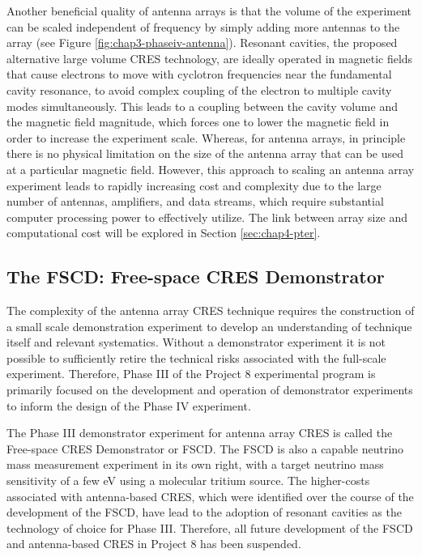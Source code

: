 Another beneficial quality of antenna arrays is that the volume of the experiment can be scaled independent of frequency by simply adding more antennas to the array (see Figure \ref{fig:chap3-phaseiv-antenna}). Resonant cavities, the proposed alternative large volume CRES technology, are ideally operated in magnetic fields that cause electrons to move with cyclotron frequencies near the fundamental cavity resonance, to avoid complex coupling of the electron to multiple cavity modes simultaneously. This leads to a coupling between the cavity volume and the magnetic field magnitude, which forces one to lower the magnetic field in order to increase the experiment scale. Whereas, for antenna arrays, in principle there is no physical limitation on the size of the antenna array that can be used at a particular magnetic field. However, this approach to scaling an antenna array experiment leads to rapidly increasing cost and complexity due to the large number of antennas, amplifiers, and data streams, which require substantial computer processing power to effectively utilize. The link between array size and computational cost will be explored in Section \ref{sec:chap4-pter}.

\subsection{The FSCD: Free-space CRES Demonstrator}
\label{sec:chap3-fscd}

The complexity of the antenna array CRES technique requires the construction of a small scale demonstration experiment to develop an understanding of technique itself and relevant systematics. Without a demonstrator experiment it is not possible to sufficiently retire the technical risks associated with the full-scale experiment. Therefore, Phase III of the Project 8 experimental program is primarily focused on the development and operation of demonstrator experiments to inform the design of the Phase IV experiment.

The Phase III demonstrator experiment for antenna array CRES is called the Free-space CRES Demonstrator or FSCD. The FSCD is also a capable neutrino mass measurement experiment in its own right, with a target neutrino mass sensitivity of a few eV using a molecular tritium source. The higher-costs associated with antenna-based CRES, which were identified over the course of the development of the FSCD, have lead to the adoption of resonant cavities as the technology of choice for Phase III. Therefore, all future development of the FSCD and antenna-based CRES in Project 8 has been suspended. 


